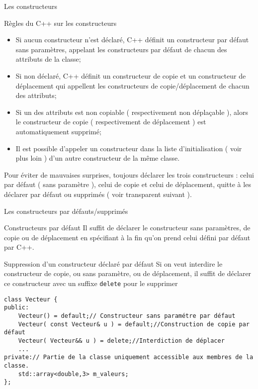 \documentclass[handout,10pt]{beamer}
\begin{document}
\begin{frame}[fragile]{Les constructeurs}
\tiny
\begin{block}{Règles du C++ sur les constructeurs}
\begin{itemize}
\item Si aucun constructeur n'est déclaré, C++ définit un constructeur par défaut sans paramètres, appelant les constructeurs
par défaut de chacun des attributs de la classe;
\item Si non déclaré, C++ définit un constructeur de copie et un constructeur de déplacement qui appellent les constructeurs de copie/déplacement de chacun des attributs;
\item Si un des attributs est non copiable ( respectivement non déplaçable ), alors le constructeur de copie ( respectivement de déplacement )
est automatiquement supprimé;
\item Il est possible d'appeler un constructeur dans la liste d'initialisation ( voir plus loin ) d'un autre constructeur de la même classe.
\end{itemize}
\alert{Pour éviter de mauvaises surprises, toujours déclarer les trois constructeurs : celui par défaut ( sans paramètre ), celui de copie et celui de déplacement, quitte à les déclarer par défaut ou supprimés ( voir transparent suivant ).}
\end{block}
\end{frame}

\begin{frame}[fragile]{Les constructeurs par défauts/supprimés}
\begin{block}{Constructeurs par défaut}
Il suffit de déclarer le constructeur sans paramètres, de copie ou de déplacement en spécifiant à la fin qu'on prend celui
défini par défaut par C++.
\end{block}
\begin{block}{Suppression d'un constructeur déclaré par défaut}
Si on veut interdire le constructeur de copie, ou sans paramètre, ou de déplacement, il suffit de déclarer ce constructeur
avec un suffixe \lstinline{delete} pour le supprimer
\end{block}

\begin{lstlisting}
class Vecteur {
public:
    Vecteur() = default;// Constructeur sans paramétre par défaut
    Vecteur( const Vecteur& u ) = default;//Construction de copie par défaut
    Vecteur( Vecteur&& u ) = delete;//Interdiction de déplacer
    ...
private:// Partie de la classe uniquement accessible aux membres de la classe.
    std::array<double,3> m_valeurs;
};
\end{lstlisting}
\end{frame}
\end{document}
